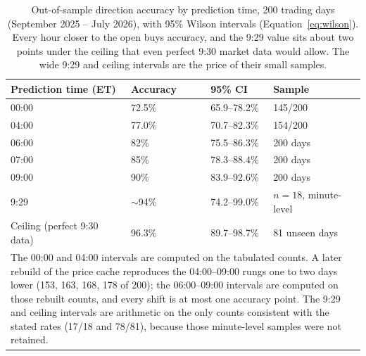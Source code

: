 \begin{table}[h]
    \centering
    \small
    \caption{Out-of-sample direction accuracy by prediction time, 200 trading
    days (September 2025 -- July 2026), with 95\% Wilson intervals
    (Equation~\ref{eq:wilson}). Every hour closer to the open buys
    accuracy, and the 9:29 value sits about two points under the ceiling that
    even perfect 9:30 market data would allow. The wide 9:29 and ceiling
    intervals are the price of their small samples.}
    \label{tab:accuracy_ladder}
    \begin{tabular}{llll}
        \toprule
        Prediction time (ET) & Accuracy & 95\% CI & Sample \\
        \midrule
        00:00 & 72.5\% & 65.9--78.2\% & 145/200 \\
        04:00 & 77.0\% & 70.7--82.3\% & 154/200 \\
        06:00 & 82\% & 75.5--86.3\% & 200 days \\
        07:00 & 85\% & 78.3--88.4\% & 200 days \\
        09:00 & 90\% & 83.9--92.6\% & 200 days \\
        9:29 & $\sim$94\% & 74.2--99.0\% & $n=18$, minute-level \\
        \midrule
        Ceiling (perfect 9:30 data) & 96.3\% & 89.7--98.7\% & 81 unseen days \\
        \bottomrule
        \multicolumn{4}{p{0.88\linewidth}}{\footnotesize The 00:00 and 04:00
        intervals are computed on the tabulated counts. A later rebuild of the
        price cache reproduces the 04:00--09:00 rungs one to two days lower
        (153, 163, 168, 178 of 200); the 06:00--09:00 intervals are computed
        on those rebuilt counts, and every shift is at most one accuracy
        point. The 9:29 and ceiling intervals are arithmetic on the only
        counts consistent with the stated rates (17/18 and 78/81), because
        those minute-level samples were not retained.} \\
    \end{tabular}
\end{table}


